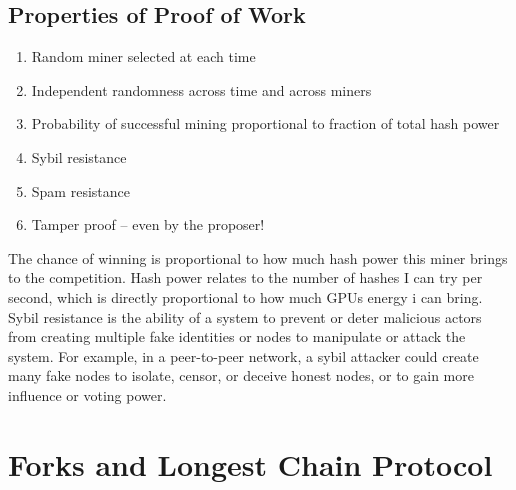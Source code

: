 \subsection*{Properties of Proof of Work}
\begin{enumerate}
	\item Random miner selected at each time
	\item Independent randomness across time and across miners
	\item Probability of successful mining proportional to fraction of total hash power
	\item Sybil resistance
	\item Spam resistance
	\item Tamper proof – even by the proposer!
\end{enumerate}
The chance of winning is proportional to how much hash power this miner brings to the competition. Hash power relates to the number of hashes I can try per second, which is directly proportional to how much GPUs energy i can bring.\\
Sybil resistance is the ability of a system to prevent or deter malicious actors from creating multiple fake identities or nodes to manipulate or attack the system. For example, in a peer-to-peer network, a sybil attacker could create many fake nodes to isolate, censor, or deceive honest nodes, or to gain more influence or voting power.

\section{Forks and Longest Chain Protocol}

